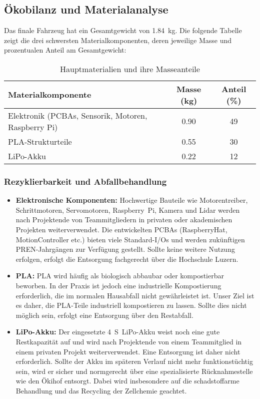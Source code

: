 \documentclass[main.tex]{subfiles} %
\begin{document}

\subsection{Ökobilanz und Materialanalyse}

Das finale Fahrzeug hat ein Gesamtgewicht von \SI{1.84}{\kilo\gram}. Die folgende 
Tabelle zeigt die drei schwersten Materialkomponenten, deren jeweilige Masse und 
prozentualen Anteil am Gesamtgewicht:

\begin{table}[H]
\centering
\begin{tabular}{|l|c|c|}
\hline
\textbf{Materialkomponente} & \textbf{Masse (kg)} & \textbf{Anteil (\%)} \\
\hline
Elektronik (PCBAs, Sensorik, Motoren, Raspberry Pi) & 0.90 & 49 \\
PLA-Strukturteile & 0.55 & 30 \\
LiPo-Akku & 0.22 & 12 \\
\hline
\end{tabular}
\caption{Hauptmaterialien und ihre Masseanteile}
\end{table}

\subsubsection*{Rezyklierbarkeit und Abfallbehandlung}

\begin{itemize}
    \item \textbf{Elektronische Komponenten:} 
    Hochwertige Bauteile wie Motorentreiber, Schrittmotoren, Servomotoren, 
    Raspberry~Pi, Kamera und Lidar werden nach Projektende von Teammitgliedern in 
    privaten oder akademischen Projekten weiterverwendet. Die entwickelten PCBAs 
    (RaspberryHat, MotionController etc.) bieten viele Standard-I/Os und werden 
    zukünftigen PREN-Jahrgängen zur Verfügung gestellt. Sollte keine weitere Nutzung 
    erfolgen, erfolgt die Entsorgung fachgerecht über die Hochschule Luzern.
    
    \item \textbf{PLA:} 
    PLA wird häufig als biologisch abbaubar oder kompostierbar beworben. In der 
    Praxis ist jedoch eine industrielle Kompostierung erforderlich, die im normalen 
    Hausabfall nicht gewährleistet ist. Unser Ziel ist es daher, die PLA-Teile 
    industriell kompostieren zu lassen. Sollte dies nicht möglich sein, erfolgt 
    eine Entsorgung über den Restabfall.
    
    \item \textbf{LiPo-Akku:} 
    Der eingesetzte \SI{4}{S}~LiPo-Akku weist noch eine gute Restkapazität auf 
    und wird nach Projektende von einem Teammitglied in einem privaten Projekt 
    weiterverwendet. Eine Entsorgung ist daher nicht erforderlich. Sollte der Akku 
    im späteren Verlauf nicht mehr funktionstüchtig sein, wird er sicher und 
    normgerecht über eine spezialisierte Rücknahmestelle wie den Ökihof entsorgt. 
    Dabei wird insbesondere auf die schadstoffarme Behandlung und das Recycling 
    der Zellchemie geachtet.
\end{itemize}
\end{document}
